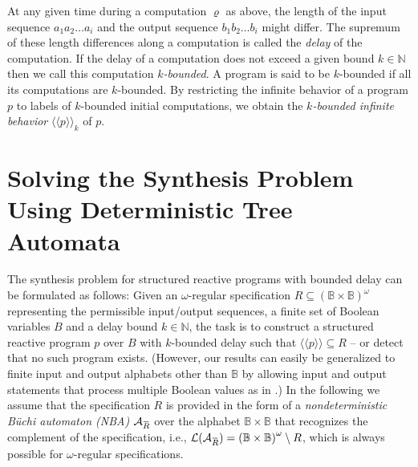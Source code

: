 \documentclass[submission,copyright,creativecommons]{eptcs}
\newcommand{\overbar}[1]{\mkern 1.5mu\overline{\mkern-1.5mu#1\mkern-1.5mu}\mkern 1.5mu}\newcommand{\nothing}{$\,$}
\newcommand{\aut}[1]{\mathcal{#1}}
\newcommand{\specaut}{\aut{A}_{\overbar{R}}}
\newcommand{\lang}[1]{\mathcal{#1}}
\newcommand{\sembrackk}[1]{\langle\langle #1 \rangle\rangle}\newcommand{\lbar}[1]{\overline{#1}}
\newcommand{\sigmain}{\mathbb{B}}
\newcommand{\sigmaout}{\mathbb{B}}
\begin{document}
At any given time during a computation $\varrho$ as above, the length of the
input sequence $a_1a_2 \ldots a_i$ and the output sequence $b_1b_2 \ldots b_i$
might differ.
The supremum of these length differences along a computation is called the
\emph{delay} of the computation.
If the delay of a computation does not exceed a given bound
$k \in \mathbb{N}$ then we call this computation \emph{$k$-bounded}.
A program is said to be $k$-bounded if all its computations are $k$-bounded.
By restricting the infinite behavior of a program $p$ to labels of
$k$-bounded initial computations,
we obtain the \emph{$k$-bounded infinite behavior} $\sembrackk{p}_k$ of $p$.


\section{Solving the Synthesis Problem Using Deterministic Tree Automata}

The synthesis problem for structured reactive programs with bounded delay
can be formulated as follows:
Given an $\omega$-regular specification
$R \subseteq \left(\sigmain \times \sigmaout\right)^\omega$ representing
the permissible input/output sequences,
a finite set of Boolean variables $B$ and a delay bound $k \in \mathbb{N}$,
the task is to construct a structured reactive program $p$ over $B$ with
$k$-bounded delay such that $\sembrackk{p} \subseteq R$ -- or detect that
no such program exists.
(However, our results can easily be generalized to finite input and
output alphabets other than $\mathbb{B}$ by allowing input and output
statements that process multiple Boolean values as in
\cite{madhusudan:LIPIcs:2011:3247}.)
In the following we assume that the specification $R$ is provided in the
form of a \emph{nondeterministic Büchi automaton (NBA)} $\specaut$
over the alphabet $\sigmain \times \sigmaout$ that recognizes the
complement of the specification, i.e.,
$\lang{L}(\specaut) =
	\left(\sigmain \times \sigmaout\right)^\omega \setminus R$,
which is always possible for $\omega$-regular specifications.
\end{document}
